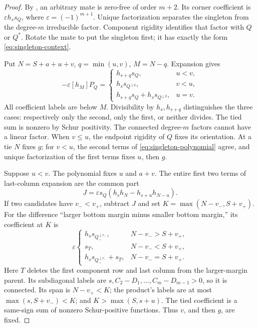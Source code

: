 \documentclass[11pt,a4paper]{amsart}
\numberwithin{equation}{section}
\theoremstyle{plain}
\theoremstyle{definition}
\begin{document}
\begin{proof}
By , an arbitrary mate is zero-free of order \(m+2\).
Its corner coefficient is \(\varepsilon h_s s_Q\), where
\(\varepsilon=(-1)^{m+1}\).  Unique factorization separates the singleton
from the degree-\(m\) irreducible factor.  Component rigidity identifies
that factor with \(Q\) or \(Q^*\).  Rotate the mate to put the singleton
first; it has exactly the form \eqref{eq:singleton-context}.

Put \(N=S+a+u+v\), \(q=\min(u,v)\), \(M=N-q\).  Expansion gives
\begin{equation}\label{eq:singleton-marker}
 -\varepsilon[h_M]P_Q=
 \begin{cases}
 h_{s+q}s_Q,&u<v,\\
 h_s s_{Q^{\downarrow q}},&v<u,\\
 h_{s+q}s_Q+h_s s_{Q^{\downarrow q}},&u=v.
 \end{cases}
\end{equation}
All coefficient labels are below \(M\).  Divisibility by
\(h_s,h_{s+q}\) distinguishes the three cases: respectively only the
second, only the first, or neither divides.  The tied sum is nonzero by
Schur positivity.  The connected degree-\(m\) factors cannot have a
linear factor.  When \(v\le u\), the endpoint rigidity of \(Q\) fixes
its orientation.  At a tie \(N\) fixes \(g\); for \(v<u\), the second
terms of \eqref{eq:singleton-polynomial} agree, and unique factorization
of the first terms fixes \(u\), then \(g\).

Suppose \(u<v\).  The polynomial fixes \(u\) and \(a+v\).
The entire first two terms of last-column expansion are the common part
\[
 J=\varepsilon s_Q(h_sh_N-h_{s+u}h_{N-u}).
\]
If two candidates have \(v_-<v_+\), subtract \(J\) and set
\(K=\max(N-v_-,S+v_+)\).  For the difference ``larger bottom margin minus
smaller bottom margin,'' its coefficient at \(K\) is
\begin{equation}\label{eq:margin-separator}
 \varepsilon\begin{cases}
 h_s s_{Q_-^{\downarrow v_-}},&N-v_->S+v_+,\\
 s_T,&N-v_-<S+v_+,\\
 h_s s_{Q_-^{\downarrow v_-}}+s_T,&N-v_-=S+v_+.
 \end{cases}
\end{equation}
Here \(T\) deletes the first component row and last column from the
larger-margin parent.  Its subdiagonal labels are
\(s,C_2-D_1,\ldots,C_m-D_{m-1}>0\), so it is connected.
Its span is \(N-v_+<K\); the product's labels are at most
\(\max(s,S+v_-)<K\); and \(K>\max(S,s+u)\).
The tied coefficient is a same-sign sum of nonzero Schur-positive
functions.  Thus \(v\), and then \(g\), are fixed.


\end{proof}
\end{document}
